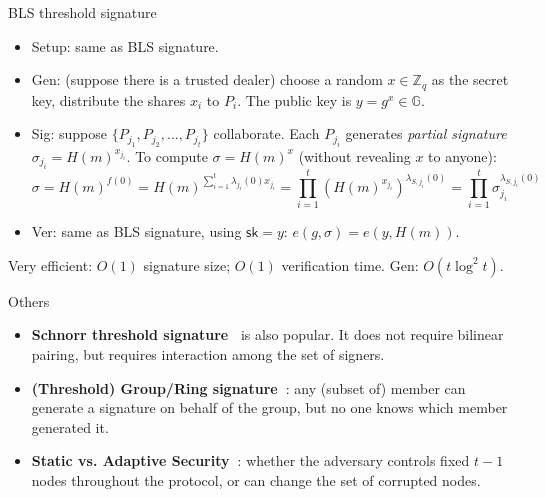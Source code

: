 \begin{frame}{BLS threshold signature~\cite{DBLP:conf/pkc/Boldyreva03}}
    \vspace{-0.5em}
\begin{itemize}
    \item Setup: same as BLS signature. 
    \item Gen: (suppose there is a trusted dealer) choose a random $x\in \mathbb{Z}_{q}$ as the secret key, distribute the shares $x_i$ to $P_i$. The public key is $y=g^x\in \mathbb{G}$. 
    \item Sig: suppose $\{P_{j_1}, P_{j_2},\dots, P_{j_t}\}$ collaborate. Each $P_{j_i}$ generates \textit{partial signature} $\sigma_{j_i}=H(m)^{x_{j_i}}$. To compute $\sigma = H(m)^{x}$ (without revealing $x$ to anyone):\vspace{-0.5em} 
    \begin{equation*}
        \sigma = H(m)^{f(0)} = H(m)^{\sum_{i=1}^t \lambda_{j_i}(0) x_{j_i}} = \prod_{i=1}^t (H(m)^{x_{j_i}})^{\lambda_{S, j_i}(0)} = \prod_{i=1}^t \sigma_{j_i}^{\lambda_{S, j_i}(0)}
    \end{equation*}
    \vspace{-0.3em}
    \item Ver: same as BLS signature, using $\mathsf{sk}=y$: $e(g, \sigma)=e(y, H(m))$. 
\end{itemize}
\vspace{0.5em}
\pause 
Very efficient: $O(1)$ signature size; $O(1)$ verification time. Gen: $O(t\log^2 t)$. 
\end{frame}

\begin{frame}{Others}
    \begin{itemize}
        \item \textbf{Schnorr threshold signature~\cite{DBLP:conf/sacrypt/KomloG20}} is also popular. It does not require bilinear pairing, but requires interaction among the set of signers. 
        \item \textbf{(Threshold) Group/Ring signature~\cite{DBLP:conf/crypto/BressonSS02,DBLP:conf/asiacrypt/RivestST01}}: any (subset of) member can generate a signature on behalf of the group, but no one knows which member generated it. 
        \item \textbf{Static vs. Adaptive Security~\cite{DBLP:conf/ccs/BachoL22,DBLP:conf/crypto/CritesKM23}}: whether the adversary controls fixed $t-1$ nodes throughout the protocol, or can change the set of corrupted nodes. 
    \end{itemize}
\end{frame}